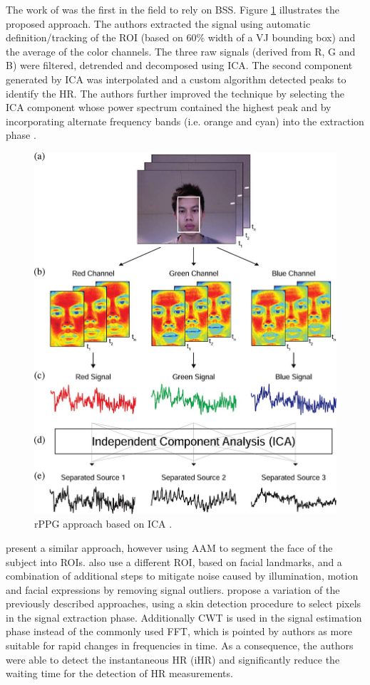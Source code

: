 The work of \textcite{poh2010non} was the first in the field to rely on BSS. Figure \ref{fig:poh} illustrates the proposed approach. The authors extracted the signal using automatic definition/tracking of the ROI (based on 60\% width of a VJ bounding box) and the average of the color channels. The three raw signals (derived from R, G and B) were filtered, detrended and decomposed using ICA. The second component generated by ICA was interpolated and a custom algorithm detected peaks to identify the HR. The authors further improved the technique by selecting the ICA component whose power spectrum contained the highest peak \parencite{poh2011advancements} and by incorporating alternate frequency bands (i.e. orange and cyan) into the extraction phase \parencite{mcduff2014improvements}.

\begin{figure}
\centering
\includegraphics[width=0.7\linewidth]{Content/figures/poh.png}
\caption{rPPG approach based on ICA \parencite{poh2010non}.}
\label{fig:poh}
\end{figure}

\textcite{Datcu_2013} present a similar approach, however using AAM to segment the face of the subject into ROIs. \textcite{li2014remote} also use a different ROI, based on facial landmarks, and a combination of additional steps to mitigate noise caused by illumination, motion and facial expressions by removing signal outliers. \textcite{bousefsaf2013continuous} propose a variation of the previously described approaches, using a skin detection procedure to select pixels in the signal extraction phase. Additionally CWT is used in the signal estimation phase instead of the commonly used FFT, which is pointed by authors as more suitable for rapid changes in frequencies in time. As a consequence, the authors were able to detect the instantaneous HR (iHR) and significantly reduce the waiting time for the detection of HR measurements.

